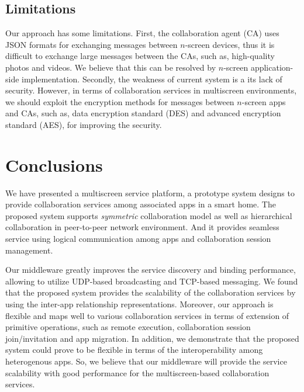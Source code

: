 \documentclass[conference]{IEEEtran}
\begin{document}
\subsection{Limitations}
    Our approach has some limitations.
    First, the collaboration agent (CA) uses JSON formats for exchanging messages between $n$-screen devices, thus it is difficult to exchange large messages between the CAs, such as, high-quality photos and videos.  We believe that this can be resolved by $n$-screen application-side implementation.
  Secondly, the weakness of current system is a its lack of security.
  However, in terms of collaboration services in multiscreen environments, we should exploit the encryption methods for messages between $n$-screen apps and CAs, such as, data encryption standard (DES) and advanced encryption standard (AES), for improving the security.


\section{Conclusions}
    \label{sc:Conclusion}
We have presented a multiscreen service platform, a prototype system designs to provide collaboration services among associated apps in a smart home. 
The proposed system supports \textit{symmetric} collaboration model as well as hierarchical collaboration in peer-to-peer network environment.
And it provides seamless service using logical communication among apps and
collaboration session management.

Our middleware greatly improves the service discovery and binding performance, allowing to utilize UDP-based broadcasting and TCP-based messaging.
    We found that the proposed system provides the scalability of the collaboration services by using the inter-app relationship representations.
    Moreover, our approach is flexible and maps well to various collaboration services in terms of extension of primitive operations, such as remote execution, collaboration session join/invitation and app migration.
In addition, we demonstrate that the proposed system could prove to be flexible in terms of the interoperability among heterogenous apps. 
So, we believe that our middleware will provide the service scalability with good performance for the multiscreen-based collaboration services.
\end{document}
